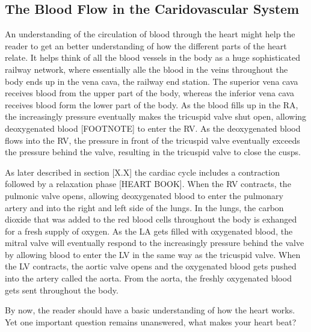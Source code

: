 
\subsection{The Blood Flow in the Caridovascular System}
An understanding of the circulation of blood through the heart might help the reader to get an better understanding of how the different parts of the heart relate. It helps think of all the blood vessels in the body as a huge sophisticated railway network, where essentially alle the blood in the veins throughout the body ends up in the vena cava, the railway end station. The superior vena cava receives blood from the upper part of the body, whereas the inferior vena cava receives blood form the lower part of the body. As the blood fills up in the RA, the increasingly pressure eventually makes the tricuspid valve shut open, allowing deoxygenated blood [FOOTNOTE] to enter the RV. As the deoxygenated blood flows into the RV, the pressure in front of the tricuspid valve eventually exceeds the pressure behind the valve, resulting in the tricuspid valve to close the cusps. 

As later described in section [X.X] the cardiac cycle includes a contraction followed by a relaxation phase [HEART BOOK]. When the RV contracts, the pulmonic valve opens, allowing deoxygenated blood to enter the pulmonary artery and into the right and left side of the lungs. In the lungs, the carbon dioxide that was added to the red blood cells throughout the body is exhanged for a fresh supply of oxygen.
As the LA gets filled with oxygenated blood, the mitral valve will eventually respond to the increasingly pressure behind the valve by allowing blood to enter the LV in the same way as the tricuspid valve. When the LV contracts, the aortic valve opens and the oxygenated blood gets pushed into the artery called the aorta. From the aorta, the freshly oxygenated blood gets sent throughout the body.

By now, the reader should have a basic understanding of how the heart works. Yet one important question remains unanswered, what makes your heart beat?

